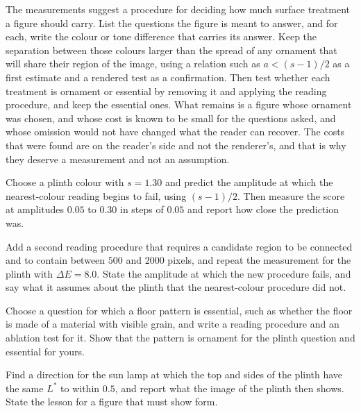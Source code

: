 The measurements suggest a procedure for deciding how much surface treatment a figure should carry. List the questions the figure is meant to answer, and for each, write the colour or tone difference that carries its answer. Keep the separation between those colours larger than the spread of any ornament that will share their region of the image, using a relation such as $a<(s-1)/2$ as a first estimate and a rendered test as a confirmation. Then test whether each treatment is ornament or essential by removing it and applying the reading procedure, and keep the essential ones. What remains is a figure whose ornament was chosen, and whose cost is known to be small for the questions asked, and whose omission would not have changed what the reader can recover. The costs that were found are on the reader's side and not the renderer's, and that is why they deserve a measurement and not an assumption.

\begin{exercise}
Choose a plinth colour with $s=1.30$ and predict the amplitude at which the nearest-colour reading begins to fail, using $(s-1)/2$. Then measure the score at amplitudes $0.05$ to $0.30$ in steps of $0.05$ and report how close the prediction was.
\end{exercise}

\begin{exercise}
Add a second reading procedure that requires a candidate region to be connected and to contain between $500$ and $2000$ pixels, and repeat the measurement for the plinth with $\Delta E=8.0$. State the amplitude at which the new procedure fails, and say what it assumes about the plinth that the nearest-colour procedure did not.
\end{exercise}

\begin{exercise}
Choose a question for which a floor pattern is essential, such as whether the floor is made of a material with visible grain, and write a reading procedure and an ablation test for it. Show that the pattern is ornament for the plinth question and essential for yours.
\end{exercise}

\begin{exercise}
Find a direction for the sun lamp at which the top and sides of the plinth have the same $L^*$ to within $0.5$, and report what the image of the plinth then shows. State the lesson for a figure that must show form.
\end{exercise}
